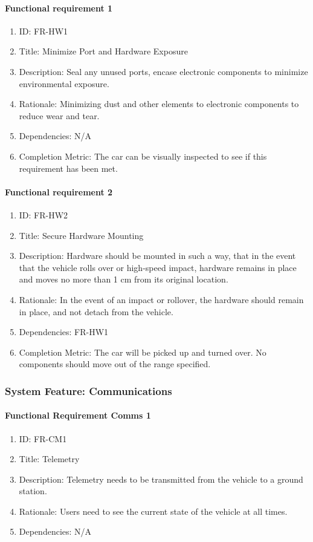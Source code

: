 \documentclass[compsoc,draftclsnofoot,onecolumn,10pt]{IEEEtran}
\begin{document}
	\paragraph{Functional requirement 1}
		\begin{enumerate}
			\item ID: FR-HW1
			\item Title: Minimize Port and Hardware Exposure
			\item Description: Seal any unused ports, encase electronic components to minimize environmental exposure.
			\item Rationale: Minimizing dust and other elements to electronic components to reduce wear and tear.
			\item Dependencies: N/A
			\item Completion Metric: The car can be visually inspected to see if this requirement has been met. 
		\end{enumerate}

	\paragraph{ Functional requirement 2}
		\begin{enumerate}
			\item ID: FR-HW2
			\item Title: Secure Hardware Mounting
			\item Description: Hardware should be mounted in such a way, that in the event that the vehicle rolls over or high-speed impact, hardware remains in place and moves no more than 1 cm from its original location.
			\item Rationale: In the event of an impact or rollover, the hardware should remain in place, and not detach from the vehicle.
			\item Dependencies: FR-HW1
			\item Completion Metric: The car will be picked up and turned over. No components should move out of the range specified. 
		\end{enumerate}



\subsubsection{System Feature: Communications}

	\paragraph{Functional Requirement Comms 1}
		\begin{enumerate}
			\item ID: FR-CM1
			\item Title: Telemetry
			\item Description: Telemetry needs to be transmitted from the vehicle to a ground station.
			\item Rationale: Users need to see the current state of the vehicle at all times.
			\item Dependencies: N/A
		\end{enumerate}
\end{document}
